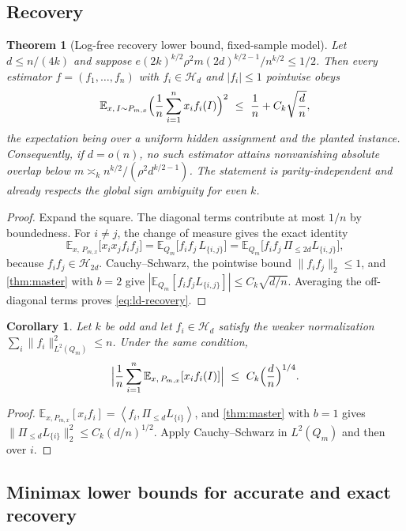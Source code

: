 \documentclass[11pt]{article}
\newtheorem{theorem}{Theorem}[section]
\newtheorem{corollary}[corollary]{Corollary}
\theoremstyle{definition}
\theoremstyle{remark}
\newcommand{\E}{\mathbb E}
\newcommand{\1}{\mathbf 1}
\newcommand{\cH}{\mathcal H}
\newcommand{\ip}[2]{\left\langle #1,#2\right\rangle}
\numberwithin{equation}{section}
\begin{document}
\subsection{Recovery}

\begin{theorem}[Log-free recovery lower bound, fixed-sample model]
\label{thm:ld-recovery}
Let $d\le n/(4k)$ and suppose
$e(2k)^{k/2}\rho^2m(2d)^{k/2-1}/n^{k/2}\le1/2$.  Then every estimator
$f=(f_1,\ldots,f_n)$ with $f_i\in\cH_d$ and $|f_i|\le1$ pointwise obeys
\begin{equation}\label{eq:ld-recovery}
 \E_{x,\,I\sim P_{m,x}}
 \Bigl(\frac1n\sum_{i=1}^nx_if_i(I)\Bigr)^{2}
 \ \le\ \frac1n+C_k\sqrt{\frac dn},
\end{equation}
the expectation being over a uniform hidden assignment and the planted
instance.  Consequently, if $d=o(n)$, no such estimator attains
nonvanishing absolute overlap below
$m\asymp_kn^{k/2}/(\rho^2d^{k/2-1})$.  The statement is
parity-independent and already respects the global sign ambiguity for
even $k$.
\end{theorem}
\begin{proof}
Expand the square.  The diagonal terms contribute at most $1/n$ by
boundedness.  For $i\ne j$, the change of measure gives the exact
identity
\[
 \E_{x,\,P_{m,x}}\bigl[x_ix_jf_if_j\bigr]
 =\E_{Q_m}\bigl[f_if_j\,L_{\{i,j\}}\bigr]
 =\E_{Q_m}\bigl[f_if_j\,\Pi_{\le2d}L_{\{i,j\}}\bigr],
\]
because $f_if_j\in\cH_{2d}$.  Cauchy--Schwarz, the pointwise bound
$\|f_if_j\|_2\le1$, and \cref{thm:master} with $b=2$ give
$|\E_{Q_m}[f_if_jL_{\{i,j\}}]|\le C_k\sqrt{d/n}$.  Averaging the
off-diagonal terms proves \cref{eq:ld-recovery}.
\end{proof}

\begin{corollary}\label{cor:ld-signed}
Let $k$ be odd and let $f_i\in\cH_d$ satisfy the weaker normalization
$\sum_i\|f_i\|_{L^2(Q_m)}^2\le n$.  Under the same condition,
\[
 \Bigl|\frac1n\sum_{i=1}^n
 \E_{x,\,P_{m,x}}[x_if_i(I)]\Bigr|
 \ \le\ C_k\Bigl(\frac dn\Bigr)^{1/4}.
\]
\end{corollary}
\begin{proof}
$\E_{x,P_{m,x}}[x_if_i]=\ip{f_i}{\Pi_{\le d}L_{\{i\}}}$, and
\cref{thm:master} with $b=1$ gives
$\|\Pi_{\le d}L_{\{i\}}\|_2^2\le C_k(d/n)^{1/2}$.  Apply
Cauchy--Schwarz in $L^2(Q_m)$ and then over $i$.
\end{proof}

\subsection{Minimax lower bounds for accurate and exact recovery}
\label{sec:minimax}
\end{document}
